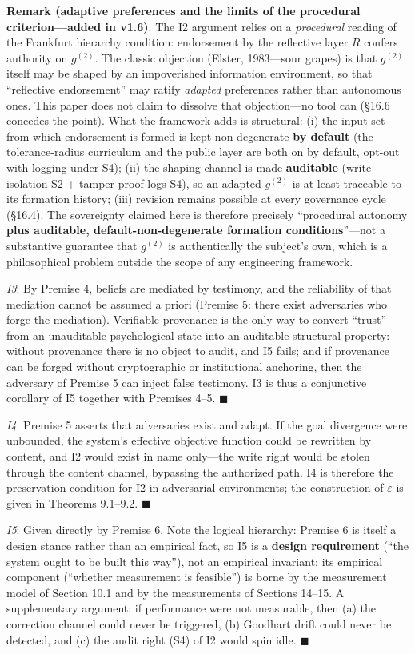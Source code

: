 \documentclass[
  11pt]{article}
\begin{document}
\textbf{Remark (adaptive preferences and the limits of the procedural
criterion---added in v1.6)}. The I2 argument relies on a
\emph{procedural} reading of the Frankfurt hierarchy condition:
endorsement by the reflective layer \(R\) confers authority on
\(g^{(2)}\). The classic objection (Elster, 1983---sour grapes) is that
\(g^{(2)}\) itself may be shaped by an impoverished information
environment, so that ``reflective endorsement'' may ratify
\emph{adapted} preferences rather than autonomous ones. This paper does
not claim to dissolve that objection---no tool can (§16.6 concedes the
point). What the framework adds is structural: (i) the input set from
which endorsement is formed is kept non-degenerate \textbf{by default}
(the tolerance-radius curriculum and the public layer are both on by
default, opt-out with logging under S4); (ii) the shaping channel is
made \textbf{auditable} (write isolation S2 + tamper-proof logs S4), so
an adapted \(g^{(2)}\) is at least traceable to its formation history;
(iii) revision remains possible at every governance cycle (§16.4). The
sovereignty claimed here is therefore precisely ``procedural autonomy
\textbf{plus auditable, default-non-degenerate formation
conditions}''---not a substantive guarantee that \(g^{(2)}\) is
authentically the subject's own, which is a philosophical problem
outside the scope of any engineering framework.

\emph{I3}: By Premise 4, beliefs are mediated by testimony, and the
reliability of that mediation cannot be assumed a priori (Premise 5:
there exist adversaries who forge the mediation). Verifiable provenance
is the only way to convert ``trust'' from an unauditable psychological
state into an auditable structural property: without provenance there is
no object to audit, and I5 fails; and if provenance can be forged
without cryptographic or institutional anchoring, then the adversary of
Premise 5 can inject false testimony. I3 is thus a conjunctive corollary
of I5 together with Premises 4--5. \(\blacksquare\)

\emph{I4}: Premise 5 asserts that adversaries exist and adapt. If the
goal divergence were unbounded, the system's effective objective
function could be rewritten by content, and I2 would exist in name
only---the write right would be stolen through the content channel,
bypassing the authorized path. I4 is therefore the preservation
condition for I2 in adversarial environments; the construction of
\(\varepsilon\) is given in Theorems 9.1--9.2. \(\blacksquare\)

\emph{I5}: Given directly by Premise 6. Note the logical hierarchy:
Premise 6 is itself a design stance rather than an empirical fact, so I5
is a \textbf{design requirement} (``the system ought to be built this
way''), not an empirical invariant; its empirical component (``whether
measurement is feasible'') is borne by the measurement model of Section
10.1 and by the measurements of Sections 14--15. A supplementary
argument: if performance were not measurable, then (a) the correction
channel could never be triggered, (b) Goodhart drift could never be
detected, and (c) the audit right (S4) of I2 would spin idle.
\(\blacksquare\)
\end{document}
